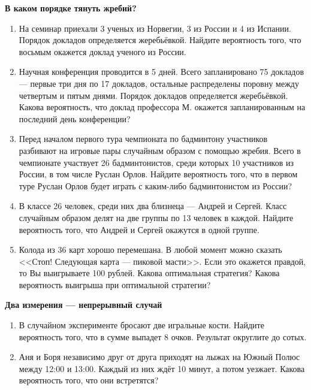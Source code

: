 \documentclass[pdftex,12pt,a4paper]{article}
\begin{document}
\textbf{В каком порядке тянуть жребий?}
\begin{enumerate}

\item На семинар приехали 3 ученых из Норвегии, 3 из России и 4 из Испании. Порядок докладов определяется жеребьёвкой. Найдите вероятность того, что восьмым окажется доклад ученого из России.

\item Научная конференция проводится в 5 дней. Всего запланировано 75 докладов — первые три дня по 17 докладов, остальные распределены поровну между четвертым и пятым днями. Порядок докладов определяется жеребьёвкой. Какова вероятность, что доклад профессора М. окажется запланированным на последний день конференции?

\item Перед началом первого тура чемпионата по бадминтону участников разбивают на игровые пары случайным образом с помощью жребия. Всего в чемпионате участвует 26 бадминтонистов, среди которых 10 участников из России, в том числе Руслан Орлов. Найдите вероятность того, что в первом туре Руслан Орлов будет играть с каким-либо бадминтонистом из России?

\item В классе 26 человек, среди них два близнеца  — Андрей и Сергей. Класс случайным образом делят на две группы по 13 человек в каждой. Найдите вероятность того, что Андрей и Сергей окажутся в одной группе.

\item Колода из 36 карт хорошо перемешана. В любой момент можно сказать <<Стоп! Следующая карта --- пиковой масти>>. Если это окажется правдой, то Вы выигрываете 100 рублей. Какова оптимальная стратегия? Какова вероятность выигрыша при оптимальной стратегии? 
\end{enumerate}



\textbf{Два измерения --- непрерывный случай}

\begin{enumerate}
\item В случайном эксперименте бросают две игральные кости. Найдите вероятность того, что в сумме выпадет 8 очков. Результат округлите до сотых.
\item Аня и Боря независимо друг от друга приходят на лыжах на Южный Полюс между 12:00 и 13:00. Каждый из них ждёт 10 минут, а потом уезжает. Какова вероятность того, что они встретятся?
\end{enumerate}
\end{document}
